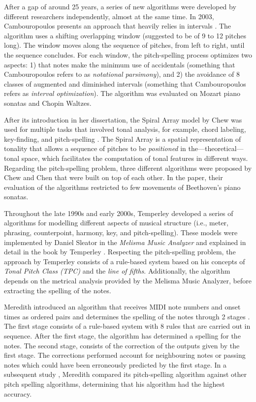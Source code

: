 After a gap of around 25 years, a series of new algorithms were developed by different researchers independently, almost at the same time. In 2003, Cambouropoulos presents an approach that heavily relies in intervals \cite{cambouropoulos2003pitch}. The algorithm uses a shifting overlapping window (suggested to be of 9 to 12 pitches long). The window moves along the sequence of pitches, from left to right, until the sequence concludes. For each window, the pitch-spelling process optimizes two aspects: 1) that notes make the minimum use of accidentals (something that Cambouropoulos refers to as \emph{notational parsimony}), and 2) the avoidance of 8 classes of augmented and diminished intervals (something that Cambouropoulos refers as \emph{interval optimization}). The algorithm was evaluated on Mozart piano sonatas and Chopin Waltzes.

After its introduction in her dissertation, the Spiral Array model by Chew was used for multiple tasks that involved tonal analysis, for example, chord labeling, key-finding, and pitch-spelling \cite{chew2000towards}. The Spiral Array is a spatial representation of tonality that allows a sequence of pitches to be \emph{positioned} in the---theoretical---tonal space, which facilitates the computation of tonal features in different ways. Regarding the pitch-spelling problem, three different algorithms were proposed by Chew and Chen \cite{chew2003determining} that were built on top of each other. In the paper, their evaluation of the algorithms restricted to few movements of Beethoven's piano sonatas.

Throughout the late 1990s and early 2000s, Temperley developed a series of algorithms for modelling different aspects of musical structure (i.e., meter, phrasing, counterpoint, harmony, key, and pitch-spelling). These models were implemented by Daniel Sleator in the \emph{Melisma Music Analyzer} and explained in detail in the book by Temperley \cite{temperley2004cognition}. Respecting the pitch-spelling problem, the approach by Temperley consists of a rule-based system based on his concepts of \emph{Tonal Pitch Class (TPC)} and the \emph{line of fifths}. Additionally, the algorithm depends on the metrical analysis provided by the Melisma Music Analyzer, before extracting the spelling of the notes.

Meredith introduced an algorithm that receives MIDI note numbers and onset times as ordered pairs and determines the spelling of the notes through 2 stages \cite{meredith2003pitch}. The first stage consists of a rule-based system with 8 rules that are carried out in sequence. After the first stage, the algorithm has determined a spelling for the notes. The second stage, consists of the correction of the outputs given by the first stage. The corrections performed account for neighbouring notes or passing notes which could have been erroneously predicted by the first stage. In a subsequent study \cite{meredith2005comparing}, Meredith compared its pitch-spelling algorithm against other pitch spelling algorithms, determining that his algorithm had the highest accuracy. 



